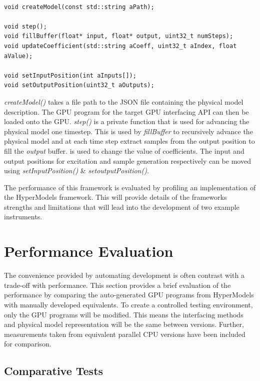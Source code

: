 \documentclass[sigconf]{nimeart}
\begin{document}
\begin{Verbatim}[breaklines=true,breakanywhere=true,fontsize=\footnotesize]

void createModel(const std::string aPath);

void step();
void fillBuffer(float* input, float* output, uint32_t numSteps);
void updateCoefficient(std::string aCoeff, uint32_t aIndex, float aValue);

void setInputPosition(int aInputs[]);
void setOutputPosition(uint32_t aOutputs);
\end{Verbatim}

\emph{createModel()} takes a file path to the JSON file containing the physical model description. The GPU program for the target GPU interfacing API can then be loaded onto the GPU. \emph{step()} is a private function that is used for advancing the physical model one timestep. This is used by \emph{fillBuffer} to recursively advance the physical model and at each time step extract samples from the output position to fill the \emph{output} buffer. is used to change the value of coefficients. The input and output positions for excitation and sample generation respectively can be moved using \emph{setInputPosition()} \& \emph{setoutputPosition()}.

The performance of this framework is evaluated by profiling an implementation of the HyperModels framework. This will provide details of the frameworks strengths and limitations that will lead into the development of two example instruments.

\section{Performance Evaluation}\label{performance-evaluation}

The convenience provided by automating development is often contrast with a trade-off with performance. This section provides a brief evaluation of the performance by comparing the auto-generated GPU programs from HyperModels with manually developed equivalents. To create a controlled testing environment, only the GPU programs will be modified. This means the interfacing methods and physical model representation will be the same between versions. Further, measurements taken from equivalent parallel CPU versions have been included for comparison.

\subsection{Comparative Tests}\label{comparative-tests}
\end{document}
